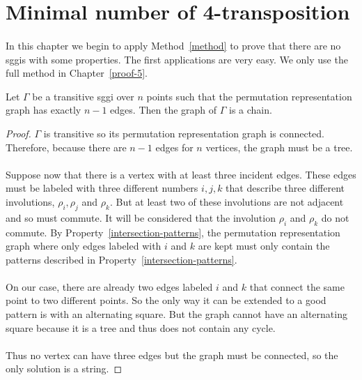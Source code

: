\section{Minimal number of 4-transposition}

\paragraph{}
In this chapter we begin to apply Method~\ref{method} to prove that there are no sggis with some properties. The first applications are very easy. We only use the full method in Chapter~\ref{proof-5}.

\begin{lemma}
  \label{graphIsString}
  Let $\Gamma$ be a transitive sggi over $n$ points such that the permutation representation graph has exactly $n-1$ edges. Then the graph of $\Gamma$ is a chain.
\end{lemma}

\begin{proof}
  $\Gamma$ is transitive so its permutation representation graph is connected. Therefore, because there are $n-1$ edges for $n$ vertices, the graph must be a tree.

  \paragraph{}
  Suppose now that there is a vertex with at least three incident edges. These edges must be labeled with three different numbers $i, j, k$ that describe three different involutions, $\rho_i, \rho_j$ and $\rho_k$. But at least two of these involutions are not adjacent and so must commute. It will be considered that the involution $\rho_i$ and $\rho_k$ do not commute. By Property~\ref{intersection-patterns}, the permutation representation graph where only edges labeled with $i$ and $k$ are kept must only contain the patterns described in Property~\ref{intersection-patterns}.

  \paragraph{}
  On our case, there are already two edges labeled $i$ and $k$ that connect the same point to two different points. So the only way it can be extended to a good pattern is with an alternating square. But the graph cannot have an alternating square because it is a tree and thus does not contain any cycle.

  \paragraph{}
  Thus no vertex can have three edges but the graph must be connected, so the only solution is a string.
\end{proof}

